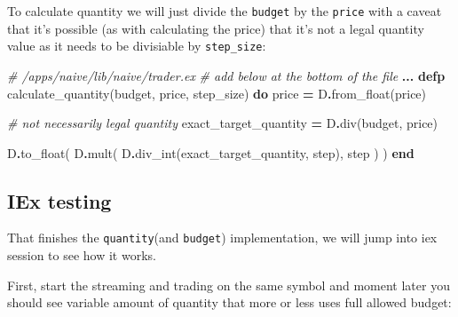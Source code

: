 \documentclass[
]{book}
\newenvironment{Shaded}{\begin{snugshade}}{\end{snugshade}}
\newcommand{\AttributeTok}[1]{\textcolor[rgb]{0.77,0.63,0.00}{#1}}
\newcommand{\CommentTok}[1]{\textcolor[rgb]{0.56,0.35,0.01}{\textit{#1}}}
\newcommand{\ErrorTok}[1]{\textcolor[rgb]{0.64,0.00,0.00}{\textbf{#1}}}
\newcommand{\ExtensionTok}[1]{#1}
\newcommand{\KeywordTok}[1]{\textcolor[rgb]{0.13,0.29,0.53}{\textbf{#1}}}
\newcommand{\NormalTok}[1]{#1}
\newcommand{\OperatorTok}[1]{\textcolor[rgb]{0.81,0.36,0.00}{\textbf{#1}}}
\newcommand{\StringTok}[1]{\textcolor[rgb]{0.31,0.60,0.02}{#1}}
\begin{document}
To calculate quantity we will just divide the \texttt{budget} by the \texttt{price} with a caveat that it's possible (as with calculating the price) that it's not a legal quantity value as it needs to be divisiable by \texttt{step\_size}:

\begin{Shaded}
\begin{Highlighting}[]
  \CommentTok{\# /apps/naive/lib/naive/trader.ex}
  \CommentTok{\# add below at the bottom of the file}
  \OperatorTok{...}
  \KeywordTok{defp}\NormalTok{ calculate\_quantity(budget, price, step\_size) }\KeywordTok{do}
\NormalTok{    price }\OperatorTok{=}\NormalTok{ D}\OperatorTok{.}\NormalTok{from\_float(price)}

    \CommentTok{\# not necessarily legal quantity}
\NormalTok{    exact\_target\_quantity }\OperatorTok{=}\NormalTok{ D}\OperatorTok{.}\NormalTok{div(budget, price)}

\NormalTok{    D}\OperatorTok{.}\NormalTok{to\_float(}
\NormalTok{      D}\OperatorTok{.}\NormalTok{mult(}
\NormalTok{        D}\OperatorTok{.}\NormalTok{div\_int(exact\_target\_quantity, step),}
\NormalTok{        step}
\NormalTok{      )}
\NormalTok{    )}
  \KeywordTok{end}
\end{Highlighting}
\end{Shaded}

\hypertarget{iex-testing-2}{%
\subsection{IEx testing}\label{iex-testing-2}}

That finishes the \texttt{quantity}(and \texttt{budget}) implementation, we will jump into iex session to see how it works.

First, start the streaming and trading on the same symbol and moment later you should see variable amount of quantity that more or less uses full allowed budget:

\begin{Shaded}
\end{Shaded}
\end{document}

